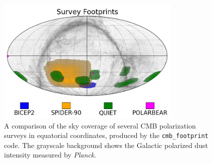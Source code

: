 \documentclass[letter]{emulateapj}
\newcommand{\planck}{\textsl{Planck}}
\begin{document}
\begin{figure}[h!]
    \centering
    \includegraphics[width=3.464in]{fig_2.png}
    \caption{A comparison of the sky coverage of several CMB polarization surveys in equatorial coordinates, produced by the \texttt{cmb\_footprint} code. The grayscale background shows the Galactic polarized dust intensity measured by \planck.}
    \label{fig:footprint}
\end{figure}


\end{document}
